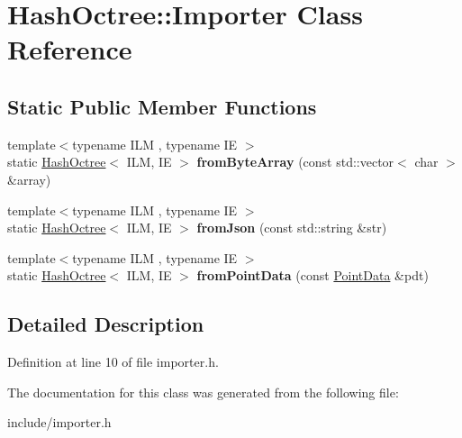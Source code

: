 \hypertarget{class_hash_octree_1_1_importer}{}\section{Hash\+Octree\+::Importer Class Reference}
\label{class_hash_octree_1_1_importer}
\subsection*{Static Public Member Functions}
\begin{DoxyCompactItemize}
\item 
\mbox{\label{class_hash_octree_1_1_importer_a61bfb4cd72a620992fbd3440237a0b11}} 
{\footnotesize template$<$typename I\+LM , typename IE $>$ }\\static \mbox{\hyperlink{class_hash_octree_1_1_hash_octree}{Hash\+Octree}}$<$ I\+LM, IE $>$ {\bfseries from\+Byte\+Array} (const std\+::vector$<$ char $>$ \&array)
\item 
\mbox{\label{class_hash_octree_1_1_importer_ab1779d953f69dda06dc13974eec0d1aa}} 
{\footnotesize template$<$typename I\+LM , typename IE $>$ }\\static \mbox{\hyperlink{class_hash_octree_1_1_hash_octree}{Hash\+Octree}}$<$ I\+LM, IE $>$ {\bfseries from\+Json} (const std\+::string \&str)
\item 
\mbox{\label{class_hash_octree_1_1_importer_ad56681c42016696b1b59001f5fce4098}} 
{\footnotesize template$<$typename I\+LM , typename IE $>$ }\\static \mbox{\hyperlink{class_hash_octree_1_1_hash_octree}{Hash\+Octree}}$<$ I\+LM, IE $>$ {\bfseries from\+Point\+Data} (const \mbox{\hyperlink{class_hash_octree_1_1_point_data}{Point\+Data}} \&pdt)
\end{DoxyCompactItemize}


\subsection{Detailed Description}


Definition at line 10 of file importer.\+h.



The documentation for this class was generated from the following file\+:\begin{DoxyCompactItemize}
\item 
include/importer.\+h\end{DoxyCompactItemize}
